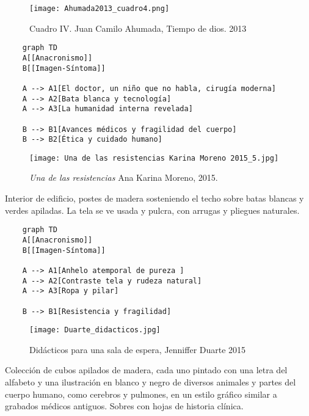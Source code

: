 \clearpage
\begin{figure}[h!]
    \centering
    \texttt{[image: Ahumada2013\_cuadro4.png]}
    \caption{Cuadro IV. Juan Camilo Ahumada, Tiempo de dios. 2013}
    \label{fig:Ahumada2013_cuadro4}
\end{figure}

\parencite[p. 12]{Ahumada2013}

\small
\singlespacing \begin{verbatim}
    graph TD
    A[[Anacronismo]]
    B[[Imagen-Síntoma]]
    
    A --> A1[El doctor, un niño que no habla, cirugía moderna]
    A --> A2[Bata blanca y tecnología]
    A --> A3[La humanidad interna revelada]
    
    B --> B1[Avances médicos y fragilidad del cuerpo]
    B --> B2[Ética y cuidado humano]

\end{verbatim}
\normalsize


\clearpage
\begin{figure}[h!]
    \centering
    \texttt{[image: Una de las resistencias Karina Moreno 2015\_5.jpg]}
    \caption{\textit{Una de las resistencias} Ana Karina Moreno, 2015.}
    \label{fig:KarinaMoreno2015}
\end{figure}

Interior de edificio, postes de madera sosteniendo el techo sobre batas blancas y verdes apiladas. La tela se ve usada y pulcra, con arrugas y pliegues naturales.

\small
\singlespacing \begin{verbatim}
    graph TD
    A[[Anacronismo]]
    B[[Imagen-Síntoma]]
    
    A --> A1[Anhelo atemporal de pureza ]
    A --> A2[Contraste tela y rudeza natural]
    A --> A3[Ropa y pilar]

    B --> B1[Resistencia y fragilidad]

\end{verbatim}
\normalsize


\clearpage
\begin{figure}[h!]
    \centering
    \texttt{[image: Duarte\_didacticos.jpg]}
    \caption{Didácticos para una sala de espera, Jenniffer Duarte 2015}
    \label{fig:JennifferDuarte2015}
\end{figure}

Colección de cubos apilados de madera, cada uno pintado con una letra del alfabeto y una ilustración en blanco y negro de diversos animales y partes del cuerpo humano, como cerebros y pulmones, en un estilo gráfico similar a grabados médicos antiguos. Sobres con hojas de historia clínica.

